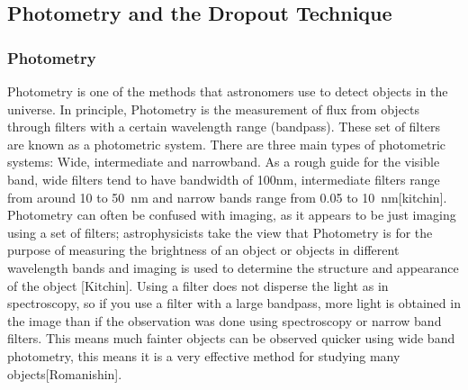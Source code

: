
	\subsection{Photometry and the Dropout Technique} %
		\label{ssub:filters_and_the_dropout_technique}

		\subsubsection{Photometry} %
		\label{ssub:photometry}
			Photometry is one of the methods that astronomers use to detect objects in the universe. In principle, Photometry is the measurement of flux from objects through filters with a certain wavelength range (bandpass). These set of filters are known as a photometric system. There are three main types of photometric systems: Wide, intermediate and narrowband. As a rough guide for the visible band, wide filters tend to have bandwidth of 100nm, intermediate filters range from around 10 to \SI{50}{\nano\metre} and narrow bands range from 0.05 to \SI{10}{\nano\metre}\cite{???}[kitchin]. Photometry can often be confused with imaging, as it appears to be just imaging using a set of filters; astrophysicists take the view that Photometry is for the purpose of measuring the brightness of an object or objects in different wavelength bands and imaging is used to determine the structure and appearance of the object [Kitchin]. Using a filter does not disperse the light as in spectroscopy, so if you use a filter with a large bandpass, more light is obtained in the image than if the observation was done using spectroscopy or narrow band filters. This means much fainter objects can be observed quicker using wide band photometry, this means it is a very effective method for studying many objects\cite{???}[Romanishin].

